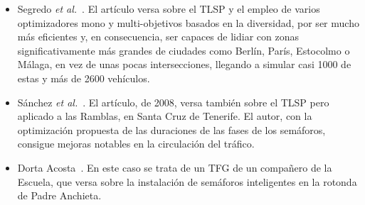 \begin{itemize}
    \item Segredo \textit{et al.}~\cite{segredo_optimising_2019}. El artículo versa sobre el TLSP y el empleo de varios optimizadores mono y multi-objetivos basados en la diversidad, por ser mucho más eficientes y, en consecuencia, ser capaces de lidiar con zonas significativamente más grandes de ciudades como Berlín, París, Estocolmo o Málaga, en vez de unas pocas intersecciones, llegando a simular casi 1000 de estas y más de 2600 vehículos.
    \item Sánchez \textit{et al.}~\cite{sanchez_applying_2008}. El artículo, de 2008, versa también sobre el TLSP pero aplicado a las Ramblas, en Santa Cruz de Tenerife. El autor, con la optimización propuesta de las duraciones de las fases de los semáforos, consigue mejoras notables en la circulación del tráfico.
    \item Dorta Acosta~\cite{dorta_acosta_simulacion_2019}. En este caso se trata de un TFG de un compañero de la Escuela, que versa sobre la instalación de semáforos inteligentes en la rotonda de Padre Anchieta.
\end{itemize}


